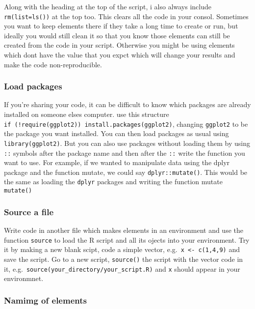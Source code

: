 \documentclass[
]{article}
\begin{document}
Along with the heading at the top of the script, i also always include
\texttt{rm(list=ls())} at the top too. This clears all the code in your
consol. Sometimes you want to keep elements there if they take a long
time to create or run, but ideally you would still clean it so that you
know those elements can still be created from the code in your script.
Otherwise you might be using elements which dont have the value that you
expct which will change your results and make the code non-reproducible.

\hypertarget{load-packages}{%
\subsubsection{Load packages}\label{load-packages}}

If you're sharing your code, it can be difficult to know which packages
are already installed on someone elses computer. use this structure
\texttt{if\ (!require(ggplot2))\ install.packages(\textquotesingle{}ggplot2\textquotesingle{})},
changing \texttt{ggplot2} to be the package you want installed. You can
then load packages as usual using \texttt{library(ggplot2)}. But you can
also use packages without loading them by using \texttt{::} symbols
after the package name and then after the \texttt{::} write the function
you want to use. For example, if we wanted to manipulate data using the
dplyr package and the function mutate, we could say
\texttt{dplyr::mutate()}. This would be the same as loading the
\texttt{dplyr} packages and writing the function mutate
\texttt{mutate()}

\hypertarget{source-a-file}{%
\subsubsection{Source a file}\label{source-a-file}}

Write code in another file which makes elements in an environment and
use the function \texttt{source} to load the R script and all its ojects
into your environment. Try it by making a new blank scipt, code a simple
vector, e.g.~\texttt{x\ \textless{}-\ c(1,4,9)} and save the script. Go
to a new script, \texttt{source()} the script with the vector code in
it,
e.g.~\texttt{source(\textquotesingle{}your\_directory/your\_script.R\textquotesingle{})}
and \texttt{x} should appear in your environmnet.

\hypertarget{namimg-of-elements}{%
\subsubsection{Namimg of elements}\label{namimg-of-elements}}
\end{document}
